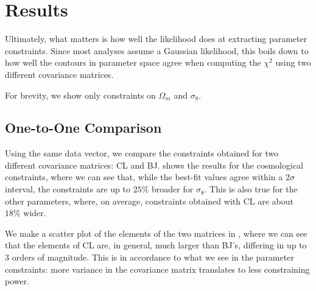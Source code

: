 \documentclass[twocolumn]{\docclass}
\begin{document}
	
	
	
	
	\section{Results}
	\label{sec:results}
	
	Ultimately, what matters is how well the likelihood does at extracting parameter constraints. Since most analyses assume a Gaussian likelihood, this boils down to how well the contours in parameter space agree when computing the $\chi^2$ using two different covariance matrices.
	
	For brevity, we show only constraints on $\Omega_m$ and $\sigma_8$.
	
	\subsection{One-to-One Comparison}
	
	Using the same data vector, we compare the constraints obtained for two different covariance matrices: CL and BJ.   shows the results for the cosmological constraints, where we can see that, while the best-fit values agree within a $2 \sigma$ interval, the constraints are up to $25\%$ broader for $\sigma_8$. This is also true for the other parameters, where, on average, constraints obtained with CL are about $18\%$ wider.
	
	We make a scatter plot of the elements of the two matrices in , where we can see that the elements of CL are, in general, much larger than BJ's, differing in up to 3 orders of magnitude. This is in accordance to what we see in the parameter constraints: more variance in the covariance matrix translates to less constraining power.
	
\end{document}
